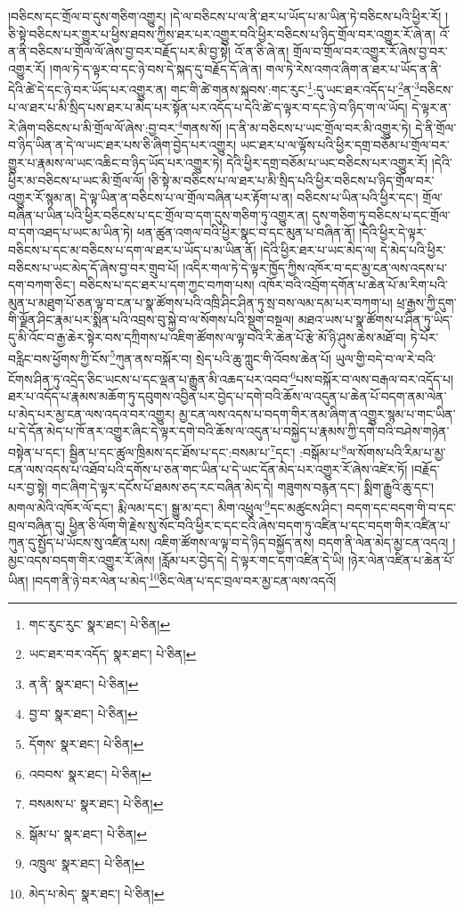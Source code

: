 །བཅིངས་དང་གྲོལ་བ་དུས་གཅིག་འགྱུར། །དེ་ལ་བཅིངས་པ་ལ་ནི་ཐར་པ་ཡོད་པ་མ་ཡིན་ཏེ་བཅིངས་པའི་ཕྱིར་རོ། །ཅི་སྟེ་བཅིངས་པར་གྱུར་པ་ཕྱིས་ཐབས་ཀྱིས་ཐར་པར་འགྱུར་བའི་ཕྱིར་བཅིངས་པ་ཉིད་གྲོལ་བར་འགྱུར་རོ་ཞེ་ན། འོ་ན་ནི་བཅིངས་པ་གྲོལ་ལོ་ཞེས་བྱ་བར་བརྗོད་པར་མི་བྱ་སྟེ། འོ་ན་ཅི་ཞེ་ན། གྲོལ་བ་གྲོལ་བར་འགྱུར་རོ་ཞེས་བྱ་བར་འགྱུར་རོ། །གལ་ཏེ་ད་ལྟར་བ་དང་ཉེ་བས་དེ་སྐད་དུ་བརྗོད་དོ་ཞེ་ན། གལ་ཏེ་རེས་འགའ་ཞིག་ན་ཐར་པ་ཡོད་ན་ནི་དེའི་ཚེ་དེ་དང་ཉེ་བར་ཡོད་པར་འགྱུར་ན། གང་གི་ཚེ་གནས་སྐབས་:གང་རུང་\footnote{གང་རུང་རུང་  སྣར་ཐང་།  པེ་ཅིན། }:དུ་ཡང་ཐར་འདོད་པ་\footnote{ཡང་ཐར་བར་འདོད་  སྣར་ཐང་།  པེ་ཅིན། }ན་\footnote{ན་ནི་  སྣར་ཐང་།  པེ་ཅིན། }བཅིངས་པ་ལ་ཐར་པ་མི་སྲིད་པས་ཐར་པ་མེད་པར་སྟོན་པར་འདོད་པ་དེའི་ཚེ་ད་ལྟར་བ་དང་ཉེ་བ་ཉིད་ག་ལ་ཡོད། དེ་ལྟར་ན་རེ་ཞིག་བཅིངས་པ་མི་གྲོལ་ལོ་ཞེས་:བྱ་བར་\footnote{བྱ་བ་  སྣར་ཐང་།  པེ་ཅིན། }གནས་སོ། །ད་ནི་མ་བཅིངས་པ་ཡང་གྲོལ་བར་མི་འགྱུར་ཏེ། དེ་ནི་གྲོལ་བ་ཉིད་ཡིན་ན་དེ་ལ་ཡང་ཐར་པས་ཅི་ཞིག་བྱེད་པར་འགྱུར། ཡང་ཐར་པ་ལ་ལྟོས་པའི་ཕྱིར་དགྲ་བཅོམ་པ་གྲོལ་བར་གྱུར་པ་རྣམས་ལ་ཡང་འཆིང་བ་ཉིད་ཡོད་པར་འགྱུར་ཏེ། དེའི་ཕྱིར་དགྲ་བཅོམ་པ་ཡང་བཅིངས་པར་འགྱུར་རོ། །དེའི་ཕྱིར་མ་བཅིངས་པ་ཡང་མི་གྲོལ་ལོ། །ཅི་སྟེ་མ་བཅིངས་པ་ལ་ཐར་པ་མི་སྲིད་པའི་ཕྱིར་བཅིངས་པ་ཉིད་གྲོལ་བར་འགྱུར་རོ་སྙམ་ན། དེ་ལྟ་ཡིན་ན་བཅིངས་པ་ལ་གྲོལ་བཞིན་པར་རྟོག་པ་ན། བཅིངས་པ་ཡིན་པའི་ཕྱིར་དང་། གྲོལ་བཞིན་པ་ཡིན་པའི་ཕྱིར་བཅིངས་པ་དང་གྲོལ་བ་དག་དུས་གཅིག་ཏུ་འགྱུར་ན། དུས་གཅིག་ཏུ་བཅིངས་པ་དང་གྲོལ་བ་དག་འཐད་པ་ཡང་མ་ཡིན་ཏེ། ཕན་ཚུན་འགལ་བའི་ཕྱིར་སྣང་བ་དང་མུན་པ་བཞིན་ནོ། །དེའི་ཕྱིར་དེ་ལྟར་བཅིངས་པ་དང་མ་བཅིངས་པ་དག་ལ་ཐར་པ་ཡོད་པ་མ་ཡིན་ནོ། །དེའི་ཕྱིར་ཐར་པ་ཡང་མེད་ལ། དེ་མེད་པའི་ཕྱིར་བཅིངས་པ་ཡང་མེད་དོ་ཞེས་བྱ་བར་གྲུབ་པོ། །འདིར་གལ་ཏེ་དེ་ལྟར་ཁྱོད་ཀྱིས་འཁོར་བ་དང་མྱ་ངན་ལས་འདས་པ་དག་བཀག་ཅིང་། བཅིངས་པ་དང་ཐར་པ་དག་ཀྱང་བཀག་པས། འཁོར་བའི་འབྲོག་དགོན་པ་ཆེན་པོ་མ་རིག་པའི་མུན་པ་མཐུག་པོ་ཅན་ལྟ་བ་ངན་པ་སྣ་ཚོགས་པའི་འཁྲི་ཤིང་ཤིན་ཏུ་སྲ་བས་ལམ་དམ་པར་བཀག་པ། ཕྲ་རྒྱས་ཀྱི་དུག་གི་ལྗོན་ཤིང་རྣམ་པར་སྨིན་པའི་འབྲས་བུ་སྐྱེ་བ་ལ་སོགས་པའི་སྡུག་བསྔལ། མཐའ་ཡས་པ་སྣ་ཚོགས་པ་ཤིན་ཏུ་ཡིད་དུ་མི་འོང་བ་རྒྱ་ཆེར་སྟེར་བས་དཀྲིགས་པ་འཇིག་ཚོགས་ལ་ལྟ་བའི་རི་ཆེན་པོ་རྩེ་མོ་ཉི་ཤུས་ཆེས་མཐོ་བ། ཏེ་པོར་བརླིང་བས་ཕྱོགས་ཀྱི་ངོས་\footnote{དོགས་  སྣར་ཐང་།  པེ་ཅིན། }ཀུན་ནས་བསྐོར་བ། སྲེད་པའི་ཆུ་ཀླུང་གི་འོབས་ཆེན་པོ། ཡུལ་གྱི་བདེ་བ་ལ་རེ་བའི་ངོགས་ཤིན་ཏུ་འདྲེད་ཅིང་ཡངས་པ་དང་ལྡན་པ་རྒྱུན་མི་འཆད་པར་འབབ་\footnote{འབབས་  སྣར་ཐང་།  པེ་ཅིན། }པས་བསྐོར་བ་ལས་བརྒལ་བར་འདོད་པ། ཐར་པ་འདོད་པ་རྣམས་མཆོག་ཏུ་དབུགས་འབྱིན་པར་བྱེད་པ་དགེ་བའི་ཆོས་ལ་འདུན་པ་ཆེན་པོ་བདག་ནམ་ལེན་པ་མེད་པར་མྱ་ངན་ལས་འདའ་བར་འགྱུར། མྱ་ངན་ལས་འདས་པ་བདག་གིར་ནམ་ཞིག་ན་འགྱུར་སྙམ་པ་གང་ཡིན་པ་དེ་དོན་མེད་པ་ཁོ་ནར་འགྱུར་ཞིང་དེ་ལྟར་དགེ་བའི་ཆོས་ལ་འདུན་པ་བསྐྱེད་པ་རྣམས་ཀྱི་དགེ་བའི་བཤེས་གཉེན་བསྟེན་པ་དང་། སྦྱིན་པ་དང་ཚུལ་ཁྲིམས་དང་ཐོས་པ་དང་:བསམ་པ་\footnote{བསམས་པ་  སྣར་ཐང་།  པེ་ཅིན། }དང་། :བསྒོམ་པ་\footnote{སྒོམ་པ་  སྣར་ཐང་།  པེ་ཅིན། }ལ་སོགས་པའི་རིམ་པ་མྱ་ངན་ལས་འདས་པ་འཐོབ་པའི་དགོས་པ་ཅན་གང་ཡིན་པ་དེ་ཡང་དོན་མེད་པར་འགྱུར་རོ་ཞེས་འཛེར་ཏོ། །བརྗོད་པར་བྱ་སྟེ། གང་ཞིག་དེ་ལྟར་དངོས་པོ་ཐམས་ཅད་རང་བཞིན་མེད་དེ། གཟུགས་བརྙན་དང་། སྨིག་རྒྱུའི་ཆུ་དང་། མགལ་མེའི་འཁོར་ལོ་དང་། རྨི་ལམ་དང་། སྒྱུ་མ་དང་། མིག་འཕྲུལ་\footnote{འཁྲུལ་  སྣར་ཐང་།  པེ་ཅིན། }དང་མཚུངས་ཤིང་། བདག་དང་བདག་གི་བ་དང་བྲལ་བཞིན་དུ། ཕྱིན་ཅི་ལོག་གི་རྗེས་སུ་སོང་བའི་ཕྱིར་ང་དང་ངའི་ཞེས་བདག་ཏུ་འཛིན་པ་དང་བདག་གིར་འཛིན་པ་ཀུན་དུ་སྤྱོད་པ་ཡོངས་སུ་འཛིན་པས། འཇིག་ཚོགས་ལ་ལྟ་བ་དེ་ཉིད་བསྐྱོད་ནས། བདག་ནི་ལེན་མེད་མྱ་ངན་འདའ། །མྱང་འདས་བདག་གིར་འགྱུར་རོ་ཞེས། །རློམ་པར་བྱེད་དེ། དེ་ལྟར་གང་དག་འཛིན་དེ་ཡི། །ཉེར་ལེན་འཛིན་པ་ཆེན་པོ་ཡིན། །བདག་ནི་ཉེ་བར་ལེན་པ་མེད་\footnote{མེད་པ་མེད་  སྣར་ཐང་།  པེ་ཅིན། }ཅིང་ལེན་པ་དང་བྲལ་བར་མྱ་ངན་ལས་འདའོ། 